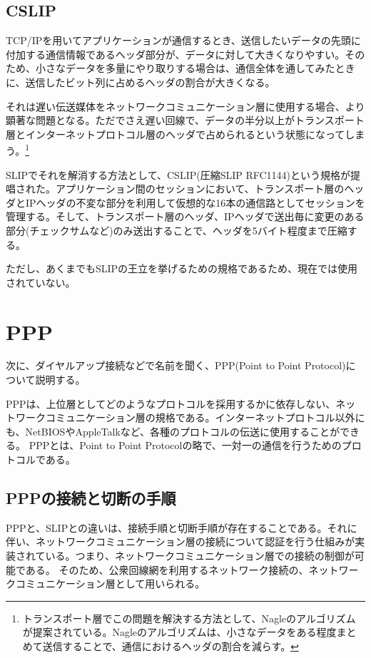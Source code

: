\subsection{CSLIP}

TCP/IPを用いてアプリケーションが通信するとき、送信したいデータの先頭に付加する通信情報であるヘッダ部分が、データに対して大きくなりやすい。そのため、小さなデータを多量にやり取りする場合は、通信全体を通してみたときに、送信したビット列に占めるヘッダの割合が大きくなる。

それは遅い伝送媒体をネットワークコミュニケーション層に使用する場合、より顕著な問題となる。ただでさえ遅い回線で、データの半分以上がトランスポート層とインターネットプロトコル層のヘッダで占められるという状態になってしまう。\footnote{トランスポート層でこの問題を解決する方法として、Nagleのアルゴリズムが提案されている。Nagleのアルゴリズムは、小さなデータをある程度まとめて送信することで、通信におけるヘッダの割合を減らす。}

SLIPでそれを解消する方法として、CSLIP(圧縮SLIP RFC1144)という規格が提唱された。アプリケーション間のセッションにおいて、トランスポート層のヘッダとIPヘッダの不変な部分を利用して仮想的な16本の通信路としてセッションを管理する。そして、トランスポート層のヘッダ、IPヘッダで送出毎に変更のある部分(チェックサムなど)のみ送出することで、ヘッダを5バイト程度まで圧縮する。

ただし、あくまでもSLIPの王立を挙げるための規格であるため、現在では使用されていない。

\section{PPP}

次に、ダイヤルアップ接続などで名前を聞く、PPP(Point to Point Protocol)について説明する。

PPPは、上位層としてどのようなプロトコルを採用するかに依存しない、ネットワークコミュニケーション層の規格である。インターネットプロトコル以外にも、NetBIOSやAppleTalkなど、各種のプロトコルの伝送に使用することができる。
PPPとは、Point to Point Protocolの略で、一対一の通信を行うためのプロトコルである。

\subsection{PPPの接続と切断の手順}
PPPと、SLIPとの違いは、接続手順と切断手順が存在することである。それに伴い、ネットワークコミュニケーション層の接続について認証を行う仕組みが実装されている。つまり、ネットワークコミュニケーション層での接続の制御が可能である。
そのため、公衆回線網を利用するネットワーク接続の、ネットワークコミュニケーション層として用いられる。

